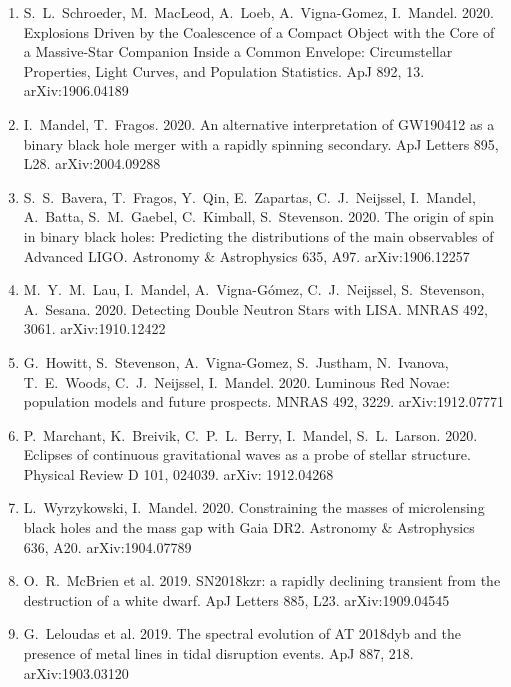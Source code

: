 \documentclass[margin,line]{res}
\begin{document}
\begin{resume}
\begin{enumerate}
\item S.~L.~Schroeder, M.~MacLeod, A.~Loeb, A.~Vigna-Gomez, I.~Mandel.  2020. Explosions Driven by the Coalescence of a Compact Object with the Core of a Massive-Star Companion Inside a Common Envelope: Circumstellar Properties, Light Curves, and Population Statistics.  ApJ 892, 13.  arXiv:1906.04189

\item I.~Mandel, T.~Fragos. 2020. An alternative interpretation of GW190412 as a binary black hole merger with a rapidly spinning secondary.  ApJ Letters 895, L28. arXiv:2004.09288

\item S.~S.~Bavera, T.~Fragos, Y.~Qin, E.~Zapartas, C.~J.~Neijssel, I.~Mandel, A.~Batta, S.~M.~Gaebel, C.~Kimball, S.~Stevenson.  2020.  The origin of spin in binary black holes: Predicting the distributions of the main observables of Advanced LIGO.  Astronomy \& Astrophysics 635, A97.  arXiv:1906.12257

\item M.~Y.~M.~Lau, I.~Mandel, A.~Vigna-G\'{o}mez, C.~J.~Neijssel, S.~Stevenson, A.~Sesana.  2020.  Detecting Double Neutron Stars with LISA.  MNRAS 492, 3061.  arXiv:1910.12422

\item G.~Howitt, S.~Stevenson, A.~Vigna-Gomez, S.~Justham, N.~Ivanova, T.~E.~Woods, C.~J.~Neijssel, I.~Mandel.  2020.  Luminous Red Novae: population models and future prospects.  MNRAS 492, 3229.  arXiv:1912.07771 

\item P.~Marchant, K.~Breivik, C.~P.~L.~Berry, I.~Mandel, S.~L.~Larson. 2020.  Eclipses of continuous gravitational waves as a probe of stellar structure.  Physical Review D 101, 024039.
arXiv: 1912.04268

\item L.~Wyrzykowski, I.~Mandel.  2020.  Constraining the masses of microlensing black holes and the mass gap with Gaia DR2.  Astronomy \& Astrophysics 636, A20.  arXiv:1904.07789

\item O.~R.~McBrien et al. 2019. SN2018kzr: a rapidly declining transient from the destruction of a white dwarf. ApJ Letters 885, L23.  arXiv:1909.04545

\item G.~Leloudas et al.  2019. The spectral evolution of AT 2018dyb and the presence of metal lines in tidal disruption events.  ApJ 887, 218.  arXiv:1903.03120


\end{enumerate}
\end{resume}
\end{document}

